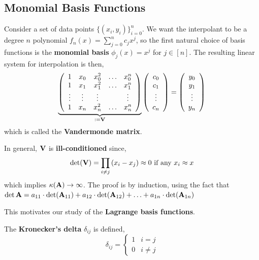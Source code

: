\subsection{Monomial Basis Functions}
Consider a set of data points $\{(x_i, y_i)\}_{i=0}^n$. We want the interpolant to be a degree $n$ polynomial $f_n(x)=\sum_{j=0}^n c_j x^j$, so the first natural choice of basis functions is the \textbf{monomial basis} $\phi_j(x)=x^j$ for $j \in [n]$. The resulting linear system for interpolation is then,
\[
\underbrace{\left(\begin{array}{ccccc}
1 & x_0 & x_0^2 & \ldots & x_0^n \\
1 & x_1 & x_1^2 & \ldots & x_1^n \\
\vdots & \vdots & \vdots & & \vdots \\
1 & x_n & x_n^2 & \ldots & x_n^n
\end{array}\right)}_{:= \mathbf{V}}\left(\begin{array}{c}
c_0 \\
c_1 \\
\vdots \\
c_n
\end{array}\right)=\left(\begin{array}{c}
y_0 \\
y_1 \\
\vdots \\
y_n
\end{array}\right)
\]
which is called the \textbf{Vandermonde matrix}.

\begin{rmk}
    In general, $\mathbf{V}$ is \textbf{ill-conditioned} since,
    \[\text{det}(\mathbf{V}) = \prod_{i \neq j}\left(x_i-x_j\right) \approx 0 \text { if any } x_i \approx x\]
    which implies $\kappa(\mathbf{A}) \rightarrow \infty$. The proof is by induction, using the fact that $\operatorname{det} \mathbf{A}=a_{11} \cdot \operatorname{det}(\mathbf{A}_{11})+ a_{12} \cdot \operatorname{det}(\mathbf{A}_{12}) +\ldots+a_{1 n} \cdot \operatorname{det}(\mathbf{A}_{1 n})$
\end{rmk}

\noindent This motivates our study of the \textbf{Lagrange basis functions}.

\begin{marginfigure}
    The \textbf{Kronecker's delta} $\delta_{i j}$ is defined,
    \[\delta_{i j}= \begin{cases}1 & i=j \\ 0 & i \neq j\end{cases}\]
\end{marginfigure}

